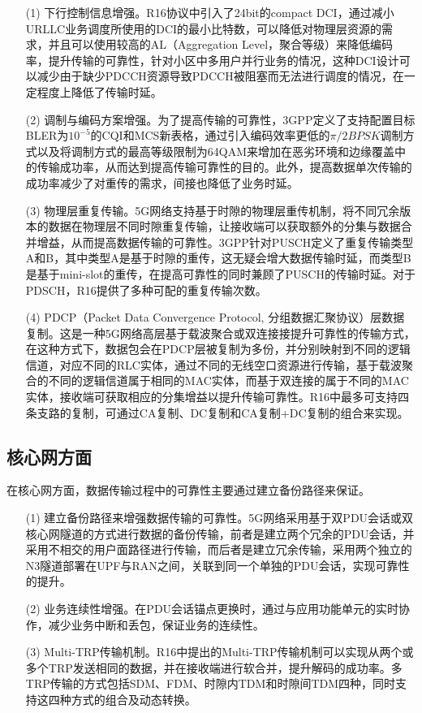 \documentclass[12pt,a4paper,oneside]{article}
\begin{document}
\begin{enumerate}
    \item[(1)] 下行控制信息增强。R16协议中引入了24bit的compact DCI，通过减小URLLC业务调度所使用的DCI的最小比特数，可以降低对物理层资源的需求，并且可以使用较高的AL（Aggregation Level，聚合等级）来降低编码率，提升传输的可靠性，针对小区中多用户并行业务的情况，这种DCI设计可以减少由于缺少PDCCH资源导致PDCCH被阻塞而无法进行调度的情况，在一定程度上降低了传输时延。
    \item[(2)] 调制与编码方案增强。为了提高传输的可靠性，3GPP定义了支持配置目标BLER为$10^{-5}$的CQI和MCS新表格，通过引入编码效率更低的$\pi /2 BPSK$调制方式以及将调制方式的最高等级限制为64QAM来增加在恶劣环境和边缘覆盖中的传输成功率，从而达到提高传输可靠性的目的。此外，提高数据单次传输的成功率减少了对重传的需求，间接也降低了业务时延。
    \item[(3)] 物理层重复传输。5G网络支持基于时隙的物理层重传机制，将不同冗余版本的数据在物理层不同时隙重复传输，让接收端可以获取额外的分集与数据合并增益，从而提高数据传输的可靠性。3GPP针对PUSCH定义了重复传输类型A和B，其中类型A是基于时隙的重传，这无疑会增大数据传输时延，而类型B是基于mini-slot的重传，在提高可靠性的同时兼顾了PUSCH的传输时延。对于PDSCH，R16提供了多种可配的重复传输次数。
    \item[(4)] PDCP（Packet Data Convergence Protocol, 分组数据汇聚协议）层数据复制。这是一种5G网络高层基于载波聚合或双连接接提升可靠性的传输方式，在这种方式下，数据包会在PDCP层被复制为多份，并分别映射到不同的逻辑信道，对应不同的RLC实体，通过不同的无线空口资源进行传输，基于载波聚合的不同的逻辑信道属于相同的MAC实体，而基于双连接的属于不同的MAC实体，接收端可获取相应的分集增益以提升传输可靠性。R16中最多可支持四条支路的复制，可通过CA复制、DC复制和CA复制+DC复制的组合来实现。
\end{enumerate}

\subsection{核心网方面}
在核心网方面，数据传输过程中的可靠性主要通过建立备份路径来保证。

\begin{enumerate}
    \item[(1)] 建立备份路径来增强数据传输的可靠性。5G网络采用基于双PDU会话或双核心网隧道的方式进行数据的备份传输，前者是建立两个冗余的PDU会话，并采用不相交的用户面路径进行传输，而后者是建立冗余传输，采用两个独立的N3隧道部署在UPF与RAN之间，关联到同一个单独的PDU会话，实现可靠性的提升。
    \item[(2)] 业务连续性增强。在PDU会话锚点更换时，通过与应用功能单元的实时协作，减少业务中断和丢包，保证业务的连续性。
    \item[(3)] Multi-TRP传输机制。R16中提出的Multi-TRP传输机制可以实现从两个或多个TRP发送相同的数据，并在接收端进行软合并，提升解码的成功率。多TRP传输的方式包括SDM、FDM、时隙内TDM和时隙间TDM四种，同时支持这四种方式的组合及动态转换。
\end{enumerate}
\end{document}
